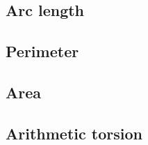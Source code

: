 
\subsection{Arc length}\label{sec:arclength}

\subsection{Perimeter}\label{sec:perimeter}

\subsection{Area}\label{sec:area}

\subsection{Arithmetic torsion}\label{sec:torsion}

\newpage
